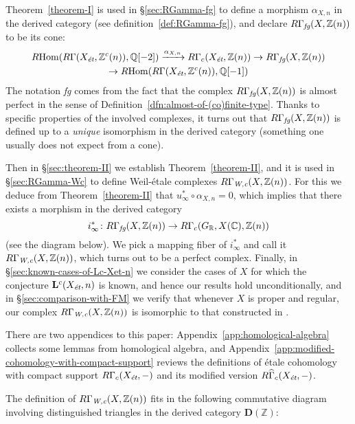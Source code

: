 \documentclass[leqno,12pt]{article}
\theoremstyle{plain}
\theoremstyle{definition}
\DeclareMathOperator{\Hom}{Hom}
\newcommand{\ZZ}{\mathbb{Z}}
\newcommand{\QQ}{\mathbb{Q}}
\newcommand{\RR}{\mathbb{R}}
\newcommand{\CC}{\mathbb{C}}
\newcommand{\Wc}{\text{\it W,c}}
\newcommand{\et}{\text{\it \'{e}t}}
\newcommand{\fg}{\text{\it fg}}
\newcommand{\RHom}{R\!\Hom}
\begin{document}
Theorem~\ref{theorem-I} is used in \S\ref{sec:RGamma-fg} to define a morphism
$\alpha_{X,n}$ in the derived category (see definition~\ref{def:RGamma-fg}),
and declare $R\Gamma_\fg (X, \ZZ(n))$ to be its cone:
\begin{multline*}
  \RHom (R\Gamma (X_\et, \ZZ^c (n)), \QQ [-2]) \xrightarrow{\alpha_{X,n}}
  R\Gamma_c (X_\et, \ZZ (n)) \to
  R\Gamma_\fg (X, \ZZ(n)) \\
  \to \RHom (R\Gamma (X_\et, \ZZ^c (n)), \QQ [-1])
\end{multline*}
The notation \emph{fg} comes from the fact that the complex
$R\Gamma_\fg (X, \ZZ(n))$ is almost perfect in the sense of
Definition~\ref{dfn:almost-of-(co)finite-type}. Thanks to specific properties
of the involved complexes, it turns out that $R\Gamma_\fg (X, \ZZ(n))$ is
defined up to a \emph{unique} isomorphism in the derived category (something one
usually does not expect from a cone).

Then in \S\ref{sec:theorem-II} we establish Theorem~\ref{theorem-II}, and it is
used in \S\ref{sec:RGamma-Wc} to define Weil-\'{e}tale complexes
$R\Gamma_\Wc (X, \ZZ(n))$. For this we deduce from Theorem~\ref{theorem-II} that
$u_\infty^* \circ \alpha_{X,n} = 0$, which implies that there exists a morphism
in the derived category
$$i_\infty^*\colon R\Gamma_\fg (X, \ZZ (n)) \to R\Gamma_c (G_\RR, X (\CC), \ZZ(n))$$
(see the diagram below). We pick a mapping fiber of $i_\infty^*$ and call it
$R\Gamma_\Wc (X, \ZZ (n))$, which turns out to be a perfect complex.
Finally, in \S\ref{sec:known-cases-of-Lc-Xet-n} we consider the cases of $X$ for
which the conjecture $\mathbf{L}^c (X_\et, n)$ is known, and hence our results
hold unconditionally, and in \S\ref{sec:comparison-with-FM} we verify that
whenever $X$ is proper and regular, our complex $R\Gamma_\Wc (X, \ZZ (n))$ is
isomorphic to that constructed in \cite{Flach-Morin-2018}.

There are two appendices to this paper: Appendix~\ref{app:homological-algebra}
collects some lemmas from homological algebra, and
Appendix~\ref{app:modified-cohomology-with-compact-support} reviews the
definitions of \'{e}tale cohomology with compact support $R\Gamma_c (X_\et, -)$
and its modified version $R\widehat{\Gamma}_c (X_\et, -)$.

\vspace{1em}

The definition of $R\Gamma_\Wc (X,\ZZ(n))$ fits in the following commutative
diagram involving distinguished triangles in the derived category
$\mathbf{D} (\ZZ)$:
\end{document}
